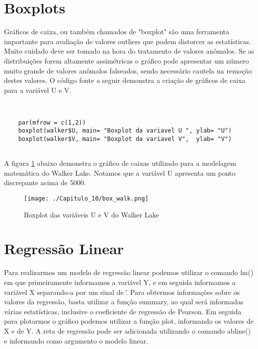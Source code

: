 \section{Boxplots} 

Gráficos de caixa, ou também chamados de "boxplot" são uma ferramenta importante para avaliação de valores outliers que podem distorcer as estatísticas. Muito cuidado deve ser tomado na hora do tratamento de valores anômalos. Se as distribuições forem altamente assimétricas o gráfico pode apresentar um número muito grande de valores anômalos falseados, sendo necessário cautela na remoção destes valores.  O código fonte a seguir demonstra a criação de gráficos de caixa para a variável U e V. 

\begin{scriptsize}
	\estiloR
	\begin{lstlisting}[]
	
	
	par(mfrow = c(1,2))
	boxplot(walker$U, main= "Boxplot da variavel U ", ylab= "U")
	boxplot(walker$V, main= "Boxplot da variavel V",  ylab= "V")
	
	\end{lstlisting}
\end{scriptsize}

A figura \ref{boxplots} abaixo demonstra o gráfico de caixas utilizado para a modelagem matemática do Walker Lake. Notamos que a variável U apresenta um ponto discrepante acima de 5000.

\FloatBarrier
\begin{figure}[h]
	\centering
	\texttt{[image: ./Capitulo\_10/box\_walk.png]}	
	\caption{Boxplot das variáveis U e V do Walker Lake}
	\label{boxplots}
\end{figure}
\FloatBarrier

\section{Regressão Linear}

Para realizarmos um modelo de regressão linear podemos utilizar o comando lm() em que primeiramente informamos a variável Y, e em seguida informamos a variável X separando-a por um sinal de \~. Para obtermos informações sobre os valores da regressão, basta utilizar a função summary, ao qual será informadas várias estatísticas, inclusive o coeficiente de regressão de Pearson. Em seguida para plotarmos o gráfico podemos utilizar a função plot, informando os valores de X e de Y. A reta de regressão pode ser adicionada utilizando o comando abline() e informando como argumento o modelo linear.

